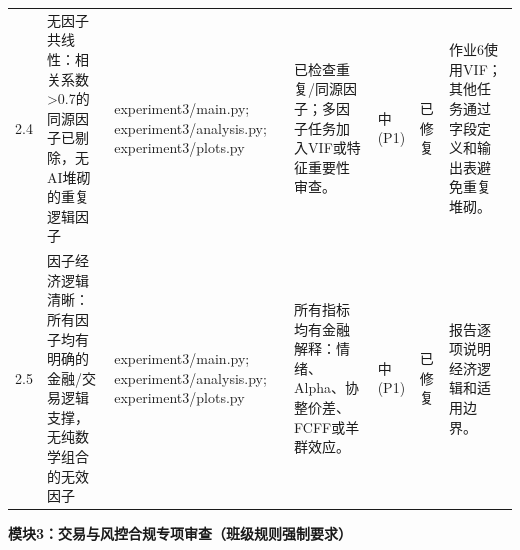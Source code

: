 \begin{longtable}{@{}L{0.045\textwidth}L{0.190\textwidth}L{0.140\textwidth}L{0.190\textwidth}L{0.060\textwidth}L{0.060\textwidth}L{0.205\textwidth}@{}}
2.4 & 无因子共线性：相关系数\textgreater0.7的同源因子已剔除，无AI堆砌的重复逻辑因子 & experiment3/\allowbreak{}main.py;\allowbreak{} experiment3/\allowbreak{}analysis.py;\allowbreak{} experiment3/\allowbreak{}plots.py & 已检查重复/\allowbreak{}同源因子；多因子任务加入VIF或特征重要性审查。 & 中(P1) & 已修复 & 作业6使用VIF；其他任务通过字段定义和输出表避免重复堆砌。 \\
2.5 & 因子经济逻辑清晰：所有因子均有明确的金融/\allowbreak{}交易逻辑支撑，无纯数学组合的无效因子 & experiment3/\allowbreak{}main.py;\allowbreak{} experiment3/\allowbreak{}analysis.py;\allowbreak{} experiment3/\allowbreak{}plots.py & 所有指标均有金融解释：情绪、Alpha、协整价差、FCFF或羊群效应。 & 中(P1) & 已修复 & 报告逐项说明经济逻辑和适用边界。 \\
\end{longtable}
\endgroup

\textbf{模块3：交易与风控合规专项审查（班级规则强制要求）}

